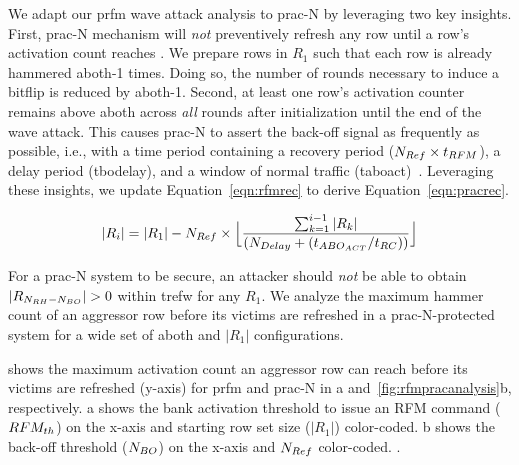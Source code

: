We adapt our \gls{prfm} wave attack analysis to \gls{prac}-N by leveraging two key insights.
First, \gls{prac}-N mechanism will \emph{not} preventively refresh any row until a row's activation count reaches  .
We prepare rows in $R_1$ such that each row is already hammered \gls{aboth}-1 times.
Doing so, the number of rounds necessary to induce a bitflip is reduced by \gls{aboth}-1.
Second, at least one row's activation counter remains above \gls{aboth} across \emph{all} rounds after initialization until the end of the wave attack.
This causes \gls{prac}-N to assert the back-off signal as frequently as possible, i.e., with a time period containing a recovery period ($N_{Ref}\times t_{RFM}$), a delay period (\gls{tbodelay}), and a window of normal traffic (\gls{taboact})~\cite{jedec2024jesd795c}.
Leveraging these insights, we update Equation~\ref{eqn:rfmrec} to derive Equation~\ref{eqn:pracrec}.

\vspace{-8pt}
\begin{equation}
\label{eqn:pracrec}
|R_{i}| = |R_{1}| - N_{Ref} \times
\Bigl\lfloor
\frac{
\sum_{k=1}^{i-1} |R_{k}|
}{
(N_{Delay} + (t_{ABO_{ACT}} / t_{RC}))
}
\Bigr\rfloor
\end{equation}

\vspace{2pt}
For a \gls{prac}-N system to be secure,
an attacker should \emph{not} be able to obtain $|R_{N_{RH}{}-N_{BO}{}}| > 0$ within \gls{trefw} for any $R_1$.
We analyze the maximum hammer count of an aggressor row before its victims are refreshed in a \gls{prac}-N-protected system 
for a wide set of \gls{aboth} and $|R_{1}|$ configurations. 

 shows the maximum activation count an aggressor row can reach before its victims are refreshed (y-axis) for \gls{prfm} and \gls{prac}-N in a and~\ref{fig:rfmpracanalysis}b, respectively.
a shows the bank activation threshold to issue an RFM command ($RFM_{th}{}$) on the x-axis and starting  row set size ($|R_1|$) color-coded. b shows the back-off threshold ($N_{BO}{}$) on the x-axis and $N_{Ref}$ color-coded.
.


